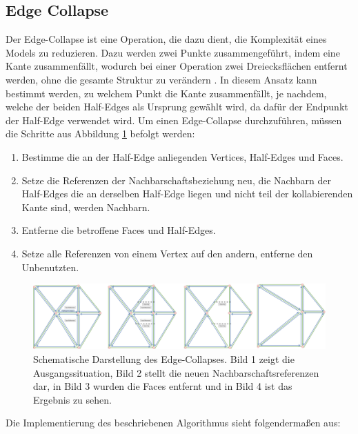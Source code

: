 \subsection{Edge Collapse}
Der Edge-Collapse ist eine Operation, die dazu dient, die Komplexit\"at eines Models zu reduzieren. Dazu werden zwei Punkte zusammengef\"uhrt, indem eine Kante zusammenf\"allt, wodurch bei einer Operation zwei Dreiecksfl\"achen entfernt werden, ohne die gesamte Struktur zu ver\"andern \cite{Castello07}. In diesem Ansatz kann bestimmt werden, zu welchem Punkt die Kante zusammenf\"allt, je nachdem, welche der beiden Half-Edges als Ursprung gew\"ahlt wird, da daf\"ur der Endpunkt der Half-Edge verwendet wird. 
Um einen Edge-Collapse durchzuf\"uhren, m\"ussen die Schritte aus Abbildung \ref{fig:edgecollapse} befolgt werden:
\begin{enumerate}
	\item Bestimme die an der Half-Edge anliegenden Vertices, Half-Edges und Faces.
	\item Setze die Referenzen der Nachbarschaftsbeziehung neu, die Nachbarn der Half-Edges die an derselben Half-Edge liegen und nicht teil der kollabierenden Kante sind, werden Nachbarn.
	\item Entferne die betroffene Faces und Half-Edges.
	\item Setze alle Referenzen von einem Vertex auf den andern, entferne den Unbenutzten.
\end{enumerate}
\begin{figure}[H]
	\centering
	\includegraphics[width=1\linewidth]{Images/EdgeCollapse}
	\caption{Schematische Darstellung des Edge-Collapses. Bild 1 zeigt die Ausgangssituation, Bild 2 stellt die neuen Nachbarschaftsreferenzen dar, in Bild 3 wurden die Faces entfernt und in Bild 4 ist das Ergebnis zu sehen.}
	\label{fig:edgecollapse}
\end{figure}
Die Implementierung des beschriebenen Algorithmus sieht folgenderma{\ss}en aus:
